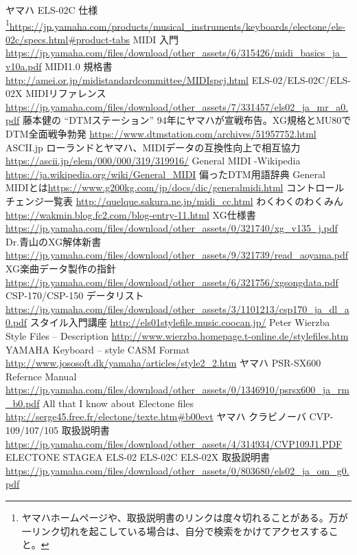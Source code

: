 \documentclass[uplatex, 10pt, dvipdfmx]{jsarticle}
\numberwithin{equation}{section}
\begin{document}
\begin{thebibliography}{99}
 ヤマハ ELS-02C 仕様\footnote{ヤマハホームページや、取扱説明書のリンクは度々切れることがある。万が一リンク切れを起こしている場合は、自分で検索をかけてアクセスすること。}\url{https://jp.yamaha.com/products/musical_instruments/keyboards/electone/els-02c/specs.html#product-tabs}
 MIDI 入門\url{https://jp.yamaha.com/files/download/other_assets/6/315426/midi_basics_ja_v10a.pdf}
 MIDI1.0 規格書 \url{http://amei.or.jp/midistandardcommittee/MIDIspcj.html}
 ELS-02/ELS-02C/ELS-02X MIDIリファレンス \url{https://jp.yamaha.com/files/download/other_assets/7/331457/els02_ja_mr_a0.pdf}
 藤本健の ``DTMステーション'' 94年にヤマハが宣戦布告。XG規格とMU80でDTM全面戦争勃発 \url{https://www.dtmstation.com/archives/51957752.html}
 ASCII.jp ローランドとヤマハ、MIDIデータの互換性向上で相互協力 \url{https://ascii.jp/elem/000/000/319/319916/}
 General MIDI -Wikipedia \url{https://ja.wikipedia.org/wiki/General_MIDI}
 偏ったDTM用語辞典 General MIDIとは\url{https://www.g200kg.com/jp/docs/dic/generalmidi.html}
 コントロールチェンジ一覧表 \url{http://quelque.sakura.ne.jp/midi_cc.html}
 わくわくのわくみん \url{https://wakmin.blog.fc2.com/blog-entry-11.html}
 XG仕様書 \url{https://jp.yamaha.com/files/download/other_assets/0/321740/xg_v135_j.pdf}
 Dr.青山のXG解体新書 \url{https://jp.yamaha.com/files/download/other_assets/9/321739/read_aoyama.pdf}
 XG楽曲データ製作の指針 \url{https://jp.yamaha.com/files/download/other_assets/6/321756/xgsongdata.pdf}
 CSP-170/CSP-150 データリスト \url{https://jp.yamaha.com/files/download/other_assets/3/1101213/csp170_ja_dl_a0.pdf}
 スタイル入門講座 \url{http://els01stylefile.music.coocan.jp/}
 Peter Wierzba Style Files -- Description \url{http://www.wierzba.homepage.t-online.de/stylefiles.htm}
 YAMAHA Keyboard -- style CASM Format \url{http://www.jososoft.dk/yamaha/articles/style2_2.htm}
 ヤマハ PSR-SX600 Refernce Manual \url{https://jp.yamaha.com/files/download/other_assets/0/1346910/psrsx600_ja_rm_b0.pdf}
 All that I know about Electone files \url{http://serge45.free.fr/electone/texte.htm#b00evt}
 ヤマハ クラビノーバ CVP-109/107/105 取扱説明書 \url{https://jp.yamaha.com/files/download/other_assets/4/314934/CVP109J1.PDF}
 ELECTONE STAGEA ELS-02 ELS-02C ELS-02X 取扱説明書 \url{https://jp.yamaha.com/files/download/other_assets/0/803680/els02_ja_om_g0.pdf}

\end{thebibliography}
\end{document}

